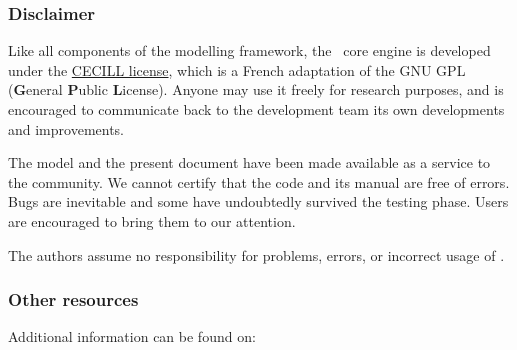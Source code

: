 

\subsubsection*{Disclaimer}

Like all components of the modelling framework,
the \eng\ core engine is developed under the \href{http://www.cecill.info}{CECILL license},
which is a French adaptation of the GNU GPL (\textbf{G}eneral \textbf{P}ublic \textbf{L}icense).
Anyone may use it freely for research purposes, and is encouraged to
communicate back to the development team its own developments and improvements.

The model and the present document have been made available as a service to the community.
We cannot certify that the code and its manual are free of errors.
Bugs are inevitable and some have undoubtedly survived the testing phase.
Users are encouraged to bring them to our attention.

The authors assume no responsibility for problems, errors, or incorrect usage of \NEMO.


\subsubsection*{Other resources}
\label{resources}

Additional information can be found on:

